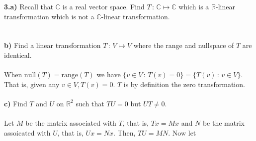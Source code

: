 \documentclass[11pt]{amsart}
\theoremstyle{definition}  %
\newcommand{\R}{\mathbb{R}}
\newcommand{\C}{\mathbb{C}}
\begin{document}
\pagebreak
\vskip 0.1cm
\noindent
{\bf 3.a)} Recall that $\C$ is a real vector space. Find $T \, : \, \C \mapsto \C$ which is a $\R$-linear transformation which is not a 
$\C$-linear transformation. \\
\\
\\
{\bf b)} Find a linear transformation $T \, : \, V \mapsto V$ where the range and nullspace of $T$ are identical. \\
\\
When $\mathrm{null} (T) = \mathrm{range } (T)$ we have $\{v \in V\,:\, T(v)=0 \} = \{ T(v) \,:\, v \in V \}$.  That is, given any $v \in V, T(v) = 0$.  $T$ is by definition the zero transformation.\\
\\
{\bf c)} Find $T$ and $U$ on $\R^2$ such that $TU = 0$ but $UT \neq 0$. \\
\\
Let $M$ be the matrix associated with $T$, that is, $Tx = Mx$ and $N$ be the matrix assoicated with $U$, that is, $Ux=Nx$.  Then, $TU = MN$.  Now let 
\end{document}
